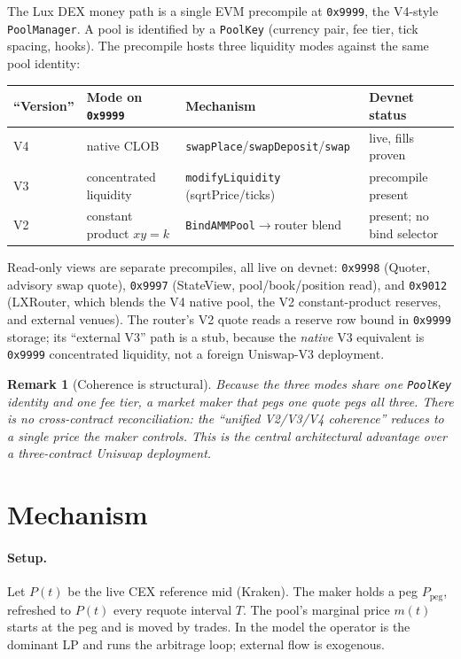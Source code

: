 \documentclass[11pt,a4paper]{article}
\newtheorem{remark}{Remark}[section]
\begin{document}
The Lux DEX money path is a single EVM precompile at \texttt{0x9999}, the V4-style
\texttt{PoolManager}. A pool is identified by a \texttt{PoolKey} (currency pair, fee
tier, tick spacing, hooks). The precompile hosts three liquidity modes against the same
pool identity:

\begin{center}
\begin{tabular}{@{}llll@{}}
\toprule
``Version'' & Mode on \texttt{0x9999} & Mechanism & Devnet status \\
\midrule
V4 & native CLOB & \texttt{swapPlace}/\texttt{swapDeposit}/\texttt{swap} & live, fills proven \\
V3 & concentrated liquidity & \texttt{modifyLiquidity} (sqrtPrice/ticks) & precompile present \\
V2 & constant product $xy{=}k$ & \texttt{BindAMMPool}$\to$router blend & present; no bind selector \\
\bottomrule
\end{tabular}
\end{center}

Read-only views are separate precompiles, all live on devnet: \texttt{0x9998}
(Quoter, advisory swap quote), \texttt{0x9997} (StateView, pool/book/position read),
and \texttt{0x9012} (LXRouter, which blends the V4 native pool, the V2 constant-product
reserves, and external venues). The router's V2 quote reads a reserve row bound in
\texttt{0x9999} storage; its ``external V3'' path is a stub, because the \emph{native}
V3 equivalent is \texttt{0x9999} concentrated liquidity, not a foreign Uniswap-V3
deployment.

\begin{remark}[Coherence is structural]
Because the three modes share one \texttt{PoolKey} identity and one fee tier, a market
maker that pegs \emph{one} quote pegs all three. There is no cross-contract
reconciliation: the ``unified V2/V3/V4 coherence'' reduces to a single price the maker
controls. This is the central architectural advantage over a three-contract Uniswap
deployment.
\end{remark}

\section{Mechanism}\label{sec:mech}

\paragraph{Setup.} Let $P(t)$ be the live CEX reference mid (Kraken). The maker holds a
peg $P_{\text{peg}}$, refreshed to $P(t)$ every requote interval $T$. The pool's
marginal price $m(t)$ starts at the peg and is moved by trades. In the model the
operator is the dominant LP and runs the arbitrage loop; external flow is exogenous.
\end{document}
